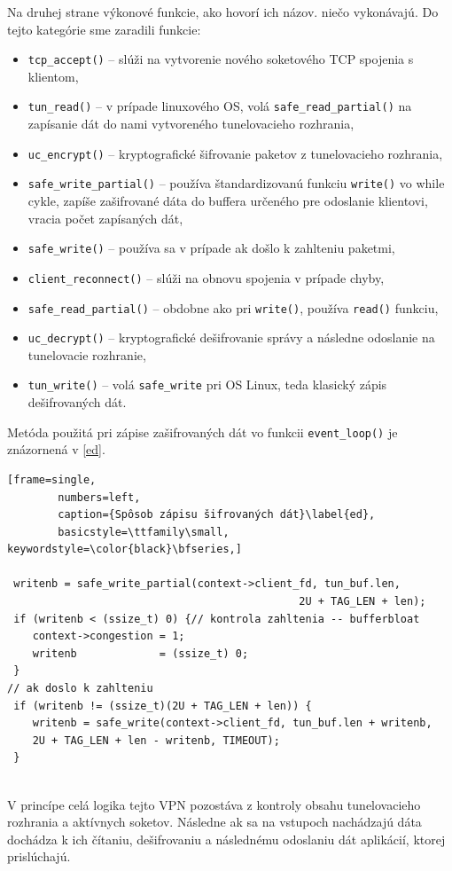 Na druhej strane výkonové funkcie, ako hovorí ich názov. niečo vykonávajú. Do tejto kategórie sme zaradili funkcie:
 \begin{itemize}
 	\item\lstinline|tcp_accept()| -- slúži na vytvorenie nového soketového TCP spojenia s klientom, 
 	\item\lstinline|tun_read()| -- v prípade linuxového OS, volá \lstinline|safe_read_partial()| na zapísanie dát do nami vytvoreného tunelovacieho rozhrania,
 	\item\lstinline|uc_encrypt()| -- kryptografické šifrovanie paketov z tunelovacieho rozhrania,
 	\item\lstinline|safe_write_partial()| -- používa štandardizovanú funkciu \lstinline|write()| vo while cykle, zapíše zašifrované dáta do buffera určeného pre odoslanie klientovi, vracia počet zapísaných dát,
 	\item\lstinline|safe_write()| -- používa sa v prípade ak došlo k zahlteniu paketmi,
 	\item\lstinline|client_reconnect()| -- slúži na obnovu spojenia v prípade chyby,
 	\item\lstinline|safe_read_partial()| -- obdobne ako pri \lstinline|write()|, používa \lstinline|read()| funkciu,
 	\item\lstinline|uc_decrypt()| -- kryptografické dešifrovanie správy a následne odoslanie na tunelovacie rozhranie,
 	\item\lstinline|tun_write()| -- volá \lstinline|safe_write| pri OS Linux, teda klasický zápis dešifrovaných dát.
 \end{itemize}
Metóda použitá pri zápise zašifrovaných dát vo funkcii \lstinline|event_loop()| je znázornená v \ref{ed}.

 \begin{minipage}{\linewidth} 	
 	\begin{lstlisting}[frame=single,
 		numbers=left,
 		caption={Spôsob zápisu šifrovaných dát}\label{ed},
 		basicstyle=\ttfamily\small, keywordstyle=\color{black}\bfseries,]
 		
 writenb = safe_write_partial(context->client_fd, tun_buf.len,
 			    	 		         		  2U + TAG_LEN + len); 
 if (writenb < (ssize_t) 0) {// kontrola zahltenia -- bufferbloat
 	context->congestion = 1; 
 	writenb             = (ssize_t) 0;
 }
// ak doslo k zahlteniu
 if (writenb != (ssize_t)(2U + TAG_LEN + len)) {
 	writenb = safe_write(context->client_fd, tun_buf.len + writenb,
 	2U + TAG_LEN + len - writenb, TIMEOUT); 
 }
   	\end{lstlisting}
\end{minipage}\\ 
V princípe celá logika tejto VPN pozostáva z kontroly obsahu tunelovacieho rozhrania a aktívnych soketov. Následne ak sa na vstupoch nachádzajú dáta dochádza k ich čítaniu, dešifrovaniu a následnému odoslaniu dát aplikácií, ktorej prislúchajú.

